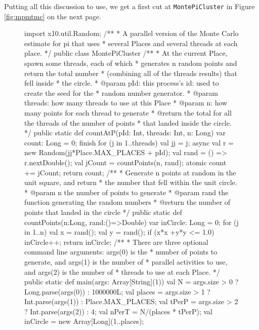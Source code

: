 Putting all this discussion to use, we get a first cut at {\tt MontePiCluster}
in Figure \ref{fig:mpmtmc} on the next page.
\begin{figure}[!htbp]
\hrulefill
\begin{xtennum}[]
import x10.util.Random;
/**
 * A parallel version of the Monte Carlo estimate for pi that uses 
 * several Places and several threads at each place.
 */
public class MontePiCluster {
    /**
     * At the current Place, spawn some threads, each of which
     * generates n random points and return the total number
     * (combining all of the threads results) that fell inside
     * the circle.
     * @param pId: this process's id: used to create the seed for the
     *    random number generator.
     * @param threads: how many threads to use at this Place
     * @param n: how many points for each thread to generate
     * @return the total for all the threads of the number of points
     * that landed inside the circle. 
     */
    public static def countAtP(pId: Int, threads: Int, n: Long) {
        var count: Long = 0;
        finish for (j in 1..threads)  {
            val jj = j;
            async {
                val r = new Random(jj*Place.MAX_PLACES + pId);
                val rand = () => r.nextDouble();
                val jCount = countPoints(n, rand);
                atomic count += jCount;
            }
        }
        return count;
    }
    /**
     * Generate n points at random in the unit square, and return
     * the number that fell within the unit circle.
     * @param n the number of points to generate
     * @param rand the function generating the random numbers
     * @return the number of points that landed in the circle
     */
    public static def countPoints(n:Long, rand:()=>Double) {
        var inCircle: Long = 0;
        for (j in 1..n) {
            val x = rand();
            val y = rand();
            if (x*x +y*y <= 1.0) inCircle++;
        }
        return inCircle;
    }
   /**
    * There are three optional command line arguments: args(0) is the
    * number of points to generate, and args(1) is the number of
    * parallel activities to use, and args(2) is the number of 
    * threads to use at each Place.
    */
   public static def main(args: Array[String](1)) {
      val N = args.size > 0 ? Long.parse(args(0)) : 1000000L;
      val places = args.size > 1 ? Int.parse(args(1)) : Place.MAX_PLACES;
      val tPerP = args.size > 2 ? Int.parse(args(2)) : 4;
      val nPerT = N/(places * tPerP);
      val inCircle = new Array[Long](1..places);
}}
\end{xtennum}
\end{figure}
